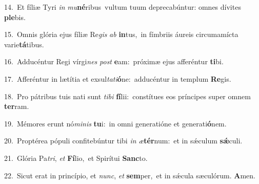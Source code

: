 {\numbfont\textcolor{\numbcolor}{14.}}~Et fíliæ Tyri \textit{in} \textit{mu}\-\textbf{né}ribus~\star vultum tuum deprecabúntur: omnes dívites \textbf{ple}\-bis.\par
{\numbfont\textcolor{\numbcolor}{15.}}~Omnis glória ejus fíliæ Re\textit{gis} \textit{ab} \textbf{in}\-tus,~\star in fímbriis áureis circumamícta varie\-\textbf{tá}\-tibus.\par
{\numbfont\textcolor{\numbcolor}{16.}}~Adducéntur Regi vírgi\textit{nes} \textit{post} \textbf{e}\-am:~\star próximæ ejus afferéntur \textbf{ti}\-bi.\par
{\numbfont\textcolor{\numbcolor}{17.}}~Afferéntur in lætítia et exsul\-\textit{ta}\-\textit{ti}\textbf{ó}ne:~\star adducéntur in templum \textbf{Re}\-gis.\par
{\numbfont\textcolor{\numbcolor}{18.}}~Pro pátribus tuis nati sunt \textit{ti}\-\textit{bi} \textbf{fí}\-lii:~\star constítues eos príncipes super omnem \textbf{ter}\-ram.\par
{\numbfont\textcolor{\numbcolor}{19.}}~Mémores erunt nó\-\textit{mi}\-\textit{nis} \textbf{tu}\-i:~\star in omni generatióne et generati\-\textbf{ó}\-nem.\par
{\numbfont\textcolor{\numbcolor}{20.}}~Proptérea pópuli confitebúntur tibi \textit{in} \textit{æ}\-\textbf{tér}num:~\star et in sǽculum \textbf{sǽ}\-culi.\par
{\numbfont\textcolor{\numbcolor}{21.}}~Glória Pa\-\textit{tri}\-, \textit{et} \textbf{Fí}\-lio,~\star et Spirítui \textbf{Sanc}\-to.\par
{\numbfont\textcolor{\numbcolor}{22.}}~Sicut erat in princípio, et \textit{nunc}\-, \textit{et} \textbf{sem}\-per,~\star et in sǽcula sæculórum. \textbf{A}\-men.\par
